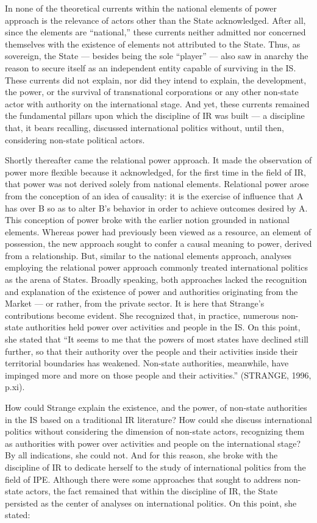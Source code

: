 In none of the theoretical currents within the national elements of power approach is the relevance of actors other than the State acknowledged. After all, since the elements are ``national,'' these currents neither admitted nor concerned themselves with the existence of elements not attributed to the State. Thus, as sovereign, the State --- besides being the sole ``player'' --- also saw in anarchy the reason to secure itself as an independent entity capable of surviving in the IS. These currents did not explain, nor did they intend to explain, the development, the power, or the survival of transnational corporations or any other non-state actor with authority on the international stage. And yet, these currents remained the fundamental pillars upon which the discipline of IR was built --- a discipline that, it bears recalling, discussed international politics without, until then, considering non-state political actors.

Shortly thereafter came the relational power approach. It made the observation of power more flexible because it acknowledged, for the first time in the field of IR, that power was not derived solely from national elements. Relational power arose from the conception of an idea of causality: it is the exercise of influence that A has over B so as to alter B's behavior in order to achieve outcomes desired by A. This conception of power broke with the earlier notion grounded in national elements. Whereas power had previously been viewed as a resource, an element of possession, the new approach sought to confer a causal meaning to power, derived from a relationship. But, similar to the national elements approach, analyses employing the relational power approach commonly treated international politics as the arena of States. Broadly speaking, both approaches lacked the recognition and explanation of the existence of power and authorities originating from the Market --- or rather, from the private sector. It is here that Strange's contributions become evident. She recognized that, in practice, numerous non-state authorities held power over activities and people in the IS. On this point, she stated that ``It seems to me that the powers of most states have declined still further, so that their authority over the people and their activities inside their territorial boundaries has weakened. Non-state authorities, meanwhile, have impinged more and more on those people and their activities.'' (STRANGE, 1996, p.xi).

How could Strange explain the existence, and the power, of non-state authorities in the IS based on a traditional IR literature? How could she discuss international politics without considering the dimension of non-state actors, recognizing them as authorities with power over activities and people on the international stage? By all indications, she could not. And for this reason, she broke with the discipline of IR to dedicate herself to the study of international politics from the field of IPE. Although there were some approaches that sought to address non-state actors, the fact remained that within the discipline of IR, the State persisted as the center of analyses on international politics. On this point, she stated:

